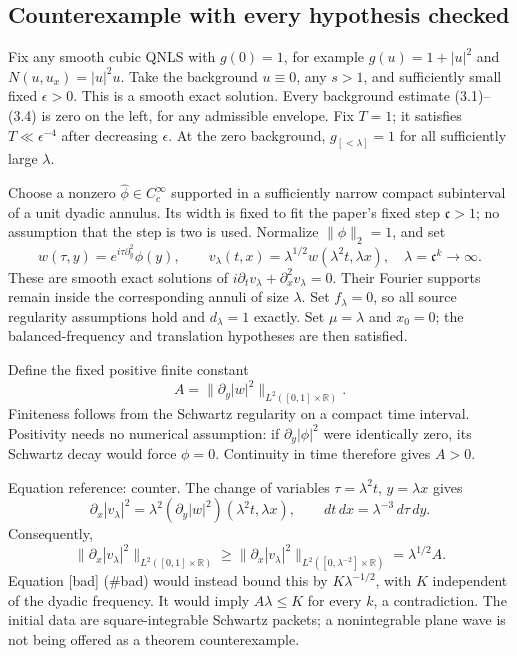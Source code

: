 \documentclass[10pt]{article}
\begin{document}
\subsection*{Counterexample with every hypothesis checked}
Fix any smooth cubic QNLS with \(g(0)=1\), for example \(g(u)=1+|u|^2\) and \(N(u,u_x)=|u|^2u\). Take the background \(u\equiv0\), any \(s>1\), and sufficiently small fixed \(\epsilon>0\). This is a smooth exact solution. Every background estimate (3.1)–(3.4) is zero on the left, for any admissible envelope. Fix \(T=1\); it satisfies \(T\ll\epsilon^{-4}\) after decreasing \(\epsilon\). At the zero background, \(g_{[<\lambda]}=1\) for all sufficiently large \(\lambda\).\par
Choose a nonzero \(\widehat\phi\in C_c^\infty\) supported in a sufficiently narrow compact subinterval of a unit dyadic annulus. Its width is fixed to fit the paper’s fixed step \(\mathfrak c>1\); no assumption that the step is two is used. Normalize \(\|\phi\|_2=1\), and set \[w(\tau,y)=e^{i\tau\partial_y^2}\phi(y),\qquad
 v_\lambda(t,x)=\lambda^{1/2}w(\lambda^2t,\lambda x),
 \quad \lambda=\mathfrak c^k\longrightarrow\infty.\] These are smooth exact solutions of \(i\partial_t v_\lambda+\partial_x^2v_\lambda=0\). Their Fourier supports remain inside the corresponding annuli of size \(\lambda\). Set \(f_\lambda=0\), so all source regularity assumptions hold and \(d_\lambda=1\) exactly. Set \(\mu=\lambda\) and \(x_0=0\); the balanced-frequency and translation hypotheses are then satisfied.\par
Define the fixed positive finite constant \[A=\|\partial_y|w|^2\|_{L^2([0,1]\times\mathbb R)}.\] Finiteness follows from the Schwartz regularity on a compact time interval. Positivity needs no numerical assumption: if \(\partial_y|\phi|^2\) were identically zero, its Schwartz decay would force \(\phi=0\). Continuity in time therefore gives \(A>0\).\par
Equation reference: counter. The change of variables \(\tau=\lambda^2t\), \(y=\lambda x\) gives \[\partial_x|v_\lambda|^2
       =\lambda^2(\partial_y|w|^2)(\lambda^2t,\lambda x),
 \qquad dt\,dx=\lambda^{-3}\,d\tau\,dy.\] Consequently, \[
 \|\partial_x|v_\lambda|^2\|_{L^2([0,1]\times\mathbb R)}
 \ge
 \|\partial_x|v_\lambda|^2\|_{L^2([0,\lambda^{-2}]\times\mathbb R)}
 =\lambda^{1/2}A.\] Equation [bad] (\#bad) would instead bound this by \(K\lambda^{-1/2}\), with \(K\) independent of the dyadic frequency. It would imply \(A\lambda\le K\) for every \(k\), a contradiction. The initial data are square-integrable Schwartz packets; a nonintegrable plane wave is not being offered as a theorem counterexample.\par
\end{document}
